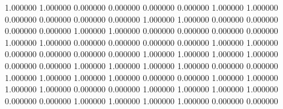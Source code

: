 1.000000 1.000000 0.000000 0.000000 0.000000 0.000000 1.000000 1.000000 0.000000 0.000000 0.000000 0.000000 1.000000 1.000000 0.000000 0.000000 0.000000 0.000000 1.000000 1.000000 0.000000 0.000000 0.000000 0.000000 1.000000 1.000000 0.000000 0.000000 0.000000 0.000000 1.000000 1.000000 0.000000 0.000000 0.000000 0.000000 1.000000 1.000000 1.000000 1.000000 0.000000 0.000000 1.000000 1.000000 1.000000 1.000000 0.000000 0.000000 1.000000 1.000000 1.000000 1.000000 0.000000 0.000000 1.000000 1.000000 1.000000 1.000000 0.000000 0.000000 1.000000 1.000000 1.000000 1.000000 0.000000 0.000000 1.000000 1.000000 1.000000 1.000000 0.000000 0.000000 